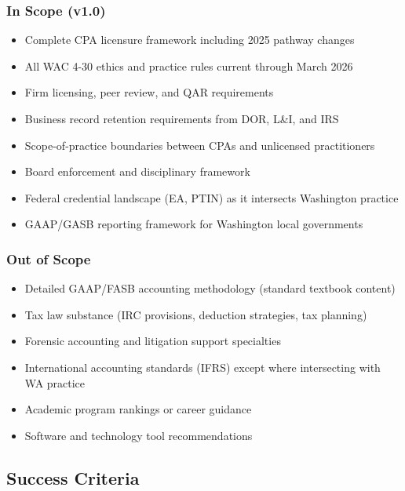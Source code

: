 \documentclass[11pt,letterpaper]{article}
\begin{document}
\subsubsection*{In Scope (v1.0)}
\begin{itemize}[leftmargin=2em]
  \item Complete CPA licensure framework including 2025 pathway changes
  \item All WAC 4-30 ethics and practice rules current through March 2026
  \item Firm licensing, peer review, and QAR requirements
  \item Business record retention requirements from DOR, L\&I, and IRS
  \item Scope-of-practice boundaries between CPAs and unlicensed practitioners
  \item Board enforcement and disciplinary framework
  \item Federal credential landscape (EA, PTIN) as it intersects Washington practice
  \item GAAP/GASB reporting framework for Washington local governments
\end{itemize}

\subsubsection*{Out of Scope}
\begin{itemize}[leftmargin=2em]
  \item Detailed GAAP/FASB accounting methodology (standard textbook content)
  \item Tax law substance (IRC provisions, deduction strategies, tax planning)
  \item Forensic accounting and litigation support specialties
  \item International accounting standards (IFRS) except where intersecting with WA practice
  \item Academic program rankings or career guidance
  \item Software and technology tool recommendations
\end{itemize}

\subsection{Success Criteria}
\end{document}
